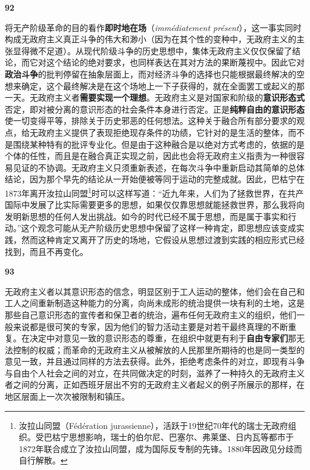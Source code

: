 \documentclass[fontset=fandol, a4paper, 12pt, openright]{ctexbook}
\makeatletter
\newcommand{\thesis}[1]{%
    \par\vspace{1.5em}%
    {\centering \textbf{\Large #1}\par}%
    \nobreak\vspace{0.5em}\nobreak
    \@afterindenttrue %
    \@afterheading    %
}
\makeatother
\begin{document}
\thesis{92}
将无产阶级革命的目的看作\textbf{即时地在场}（\textit{immédiatement présent}），这一事实同时构成无政府主义真正斗争的伟大和渺小（因为在其个性的变种中，无政府主义的主张显得微不足道）。从现代阶级斗争的历史思想中，集体无政府主义仅仅保留了结论，而它对这个结论的绝对要求，也同样表达在其对方法的果断蔑视中。因此它对\textbf{政治斗争}的批判停留在抽象层面上，而对经济斗争的选择也只能根据最终解决的空想来确定，这个最终解决是在这个场地上一下子获得的，就在全面罢工或起义的那一天。无政府主义者\textbf{需要实现一个理想}。无政府主义是对国家和阶级的\textbf{意识形态式}否定，即对被分离的意识形态的社会条件本身进行否定。正是\textbf{纯粹自由的意识形态}使一切变得平等，排除关于历史邪恶的任何想法。这种关于融合所有部分要求的观点，给无政府主义提供了表现拒绝现存条件的功绩，它针对的是生活的整体，而不是围绕某种特有的批评专业化。但是由于这种融合是以绝对方式考虑的，依据的是个体的任性，而且是在融合真正实现之前，因此也会将无政府主义指责为一种很容易见证的不协调。无政府主义只须重新表述，在每次斗争中重新启动其简单的总体结论，因为那个早先的结论从一开始便被等同于运动的完整成就。因此，巴枯宁在1873年离开汝拉山同盟\footnote{汝拉山同盟（Fédération jurassienne），活跃于19世纪70年代的瑞士无政府组织。受巴枯宁思想影响，瑞士的伯尔尼、巴塞尔、弗莱堡、日内瓦等都市于1872年联合成立了汝拉山同盟，成为国际反专制的先锋。1880年因政见分歧而自行解散。}时可以这样写道：“近九年来，人们为了拯救世界，在共产国际中发展了比实际需要更多的思想，如果仅仅靠思想就能拯救世界，那么我将向发明新思想的任何人发出挑战。如今的时代已经不属于思想，而是属于事实和行动。”这个观念可能从无产阶级历史思想中保留了这样一种肯定，即思想应该变成实践，然而这种肯定又离开了历史的场地，它假设从思想过渡到实践的相应形式已经找到，而且不再变化。

\thesis{93}
无政府主义者以其意识形态的信念，明显区别于工人运动的整体，他们会在自己和工人之间重新制造这种能力的分离，向尚未成形的统治提供一块有利的土地，这是那些自己意识形态的宣传者和保卫者的统治，遍布任何无政府主义的组织，他们一般来说都是很可笑的专家，因为他们的智力活动主要是对若干最终真理的不断重复。在决定中对意见一致的意识形态的尊重，在组织中就更有利于\textbf{自由专家们}那无法控制的权威；而革命的无政府主义从被解放的人民那里所期待的也是同一类型的意见一致，并且通过同样的方法去获得。此外，拒绝考虑条件的对立，即现有斗争与自由个人社会之间的对立，在共同做决定的时刻，滋养了一种持久的无政府主义者之间的分离，正如西班牙层出不穷的无政府主义者起义的例子所展示的那样，在地区层面上一次次被限制和镇压。
\end{document}
